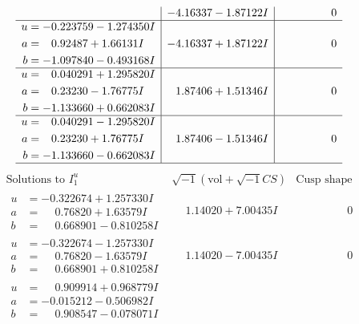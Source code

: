 \documentclass[1p]{elsarticle_modified}
\theoremstyle{definition}
\newcommand{\I}{\sqrt{-1}}
\begin{document}
$$\begin{array}{c|c|c}
 & -4.16337 - 1.87122 I & \phantom{-0.000000 } 0 \\ \hline\begin{aligned}
u &= -0.223759 - 1.274350 I \\
a &= \phantom{-}0.92487 + 1.66131 I \\
b &= -1.097840 - 0.493168 I\end{aligned}
 & -4.16337 + 1.87122 I & \phantom{-0.000000 } 0 \\ \hline\begin{aligned}
u &= \phantom{-}0.040291 + 1.295820 I \\
a &= \phantom{-}0.23230 - 1.76775 I \\
b &= -1.133660 + 0.662083 I\end{aligned}
 & \phantom{-}1.87406 + 1.51346 I & \phantom{-0.000000 } 0 \\ \hline\begin{aligned}
u &= \phantom{-}0.040291 - 1.295820 I \\
a &= \phantom{-}0.23230 + 1.76775 I \\
b &= -1.133660 - 0.662083 I\end{aligned}
 & \phantom{-}1.87406 - 1.51346 I & \phantom{-0.000000 } 0\\
 \hline 
 \end{array}$$\newpage$$\begin{array}{c|c|c}  
\text{Solutions to }I^u_{1}& \I (\text{vol} + \sqrt{-1}CS) & \text{Cusp shape}\\
 \hline 
\begin{aligned}
u &= -0.322674 + 1.257330 I \\
a &= \phantom{-}0.76820 + 1.63579 I \\
b &= \phantom{-}0.668901 - 0.810258 I\end{aligned}
 & \phantom{-}1.14020 + 7.00435 I & \phantom{-0.000000 } 0 \\ \hline\begin{aligned}
u &= -0.322674 - 1.257330 I \\
a &= \phantom{-}0.76820 - 1.63579 I \\
b &= \phantom{-}0.668901 + 0.810258 I\end{aligned}
 & \phantom{-}1.14020 - 7.00435 I & \phantom{-0.000000 } 0 \\ \hline\begin{aligned}
u &= \phantom{-}0.909914 + 0.968779 I \\
a &= -0.015212 - 0.506982 I \\
b &= \phantom{-}0.908547 - 0.078071 I\end{aligned}

\end{array}$$
\end{document}
